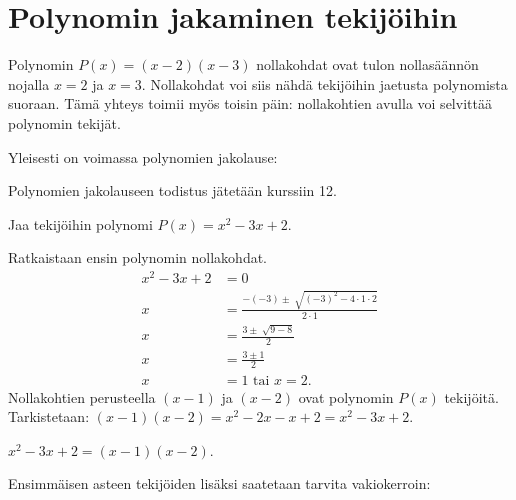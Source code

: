 \section{Polynomin jakaminen tekijöihin}


Polynomin $P(x)=(x-2)(x-3)$ nollakohdat ovat tulon nollasäännön nojalla $x=2$ ja $x=3$. Nollakohdat voi siis nähdä tekijöihin jaetusta polynomista suoraan. Tämä  yhteys toimii myös toisin päin: nollakohtien avulla voi selvittää polynomin tekijät.

Yleisesti on voimassa polynomien jakolause:


Polynomien jakolauseen todistus jätetään kurssiin 12.

\begin{esimerkki}
Jaa tekijöihin polynomi $P(x)=x^2-3x+2$.
\begin{esimratk}
Ratkaistaan ensin polynomin nollakohdat.
\begin{align*}
x^2-3x+2&=0 \\
x&=\frac{-(-3) \pm \sqrt[]{(-3)^2-4 \cdot 1 \cdot 2}}{2 \cdot 1} \\
x&=\frac{3 \pm \sqrt[]{9-8}}{2} \\
x&=\frac{3 \pm 1}{2} \\
x&=1 \textrm{ tai } x = 2.
\end{align*}
Nollakohtien perusteella $(x-1)$ ja $(x-2)$ ovat polynomin $P(x)$ tekijöitä.
Tarkistetaan:
 $(x-1)(x-2)=x^2-2x-x+2= x^2-3x+2$.
\end{esimratk}
\begin{esimvast}
$x^2-3x+2 = (x-1)(x-2)$.
\end{esimvast}
\end{esimerkki}

Ensimmäisen asteen tekijöiden lisäksi saatetaan tarvita vakiokerroin:

